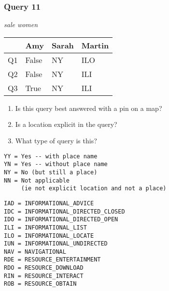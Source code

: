 \begin{frame}[fragile]
\frametitle{Query 11}
\vspace{1em}

\emph{sale women}

\vfill

\begin{table}
  \centering
  \begin{tabular}{ l l l l }
    & \textbf{Amy} & \textbf{Sarah} & \textbf{Martin}\\
    \toprule
    Q1 & False & NY & ILO\\
Q2 & False & NY & ILI\\
Q3 & True & NY & ILI\\
    \bottomrule
  \end{tabular}
\end{table}

\vfill

\tiny{

\begin{enumerate}
\item Is this query best answered with a pin on a map?
\item Is a location explicit in the query?
\item What type of query is this?
\end{enumerate}

\vfill

\begin{multicols}{2}
\begin{verbatim}
YY = Yes -- with place name
YN = Yes -- without place name
NY = No (but still a place)
NN = Not applicable 
     (ie not explicit location and not a place)
\end{verbatim}

\columnbreak
\begin{verbatim}
IAD = INFORMATIONAL_ADVICE
IDC = INFORMATIONAL_DIRECTED_CLOSED
IDO = INFORMATIONAL_DIRECTED_OPEN
ILI = INFORMATIONAL_LIST
ILO = INFORMATIONAL_LOCATE
IUN = INFORMATIONAL_UNDIRECTED
NAV = NAVIGATIONAL
RDE = RESOURCE_ENTERTAINMENT
RDO = RESOURCE_DOWNLOAD
RIN = RESOURCE_INTERACT
ROB = RESOURCE_OBTAIN
\end{verbatim}
\end{multicols}
}

\end{frame}


